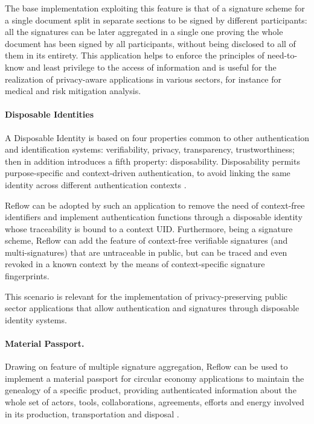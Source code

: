 \documentclass[twocolumn]{article}
\begin{document}
The base implementation exploiting this feature is that of a signature
scheme for a single document split in separate sections to be signed by
different participants: all the signatures can be later aggregated in a
single one proving the whole document has been signed by all
participants, without being disclosed to all of them in its entirety.
This application helps to enforce the principles of need-to-know and
least privilege to the access of information \citep{info-protection} and
is useful for the realization of privacy-aware applications in various
sectors, for instance for medical and risk mitigation analysis.


\paragraph*{Disposable Identities}

A Disposable Identity is based on four properties common to other
authentication and identification systems: verifiability, privacy,
transparency, trustworthiness; then in addition introduces a fifth
property: disposability. Disposability permits purpose-specific and
context-driven authentication, to avoid linking the same identity across
different authentication contexts \citep{dispid}.

Reflow can be adopted by such an application to remove the need of
context-free identifiers and implement authentication functions through
a disposable identity whose traceability is bound to a context UID.
Furthermore, being a signature scheme, Reflow can add the feature of
context-free verifiable signatures (and multi-signatures) that are
untraceable in public, but can be traced and even revoked in a known
context by the means of context-specific signature fingerprints.

This scenario is relevant for the implementation of privacy-preserving
public sector applications that allow authentication and signatures
through disposable identity systems.   


\paragraph*{Material Passport.}
Drawing on feature of multiple signature aggregation, Reflow can
be used to implement a {material passport} for circular economy
applications \citep{material-passport} to maintain the genealogy of a
specific product, providing authenticated information about  the whole
set of actors, tools, collaborations, agreements, efforts and energy
involved in its production, transportation and disposal
\citep{Reflow-os}.
\end{document}
